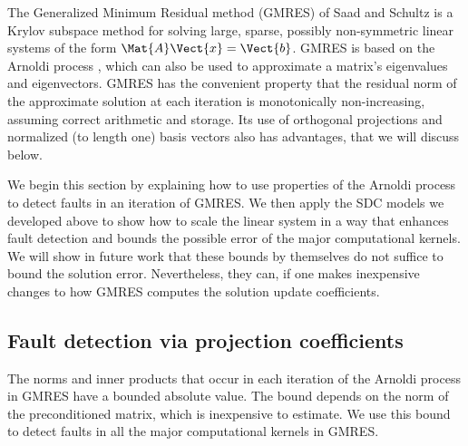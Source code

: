 The Generalized Minimum Residual method (GMRES) of Saad and Schultz
\cite{jje:saad1986gmres} is a Krylov subspace method for solving
large, sparse, possibly non-symmetric linear systems of the form
$\Mat{A}\Vect{x}=\Vect{b}$.
GMRES is based on the Arnoldi process \cite{mfh:arnoldi1951principle}, which
can also be used to approximate a matrix's eigenvalues and
eigenvectors.  GMRES has the convenient property that the residual
norm of the approximate solution at each iteration is monotonically
non-increasing, assuming correct arithmetic and storage.  Its use of
orthogonal projections and normalized (to length one) basis vectors
also has advantages, that we will discuss below.

We begin this section by explaining how to use properties of the
Arnoldi process to detect faults in an iteration of GMRES.  We then
apply the SDC models we developed above to show how to scale the
linear system in a way that enhances fault detection and bounds the
possible error of the major computational kernels.  We will show in
future work that these bounds by themselves do not suffice to bound
the solution error.  Nevertheless, they can, if one makes inexpensive
changes to how GMRES computes the solution update coefficients.

\subsection{Fault detection via projection coefficients}
\label{jje:sec:gmres:hessenberg}


The norms and inner products that occur in each iteration of the
Arnoldi process in GMRES have a bounded absolute value.  
The bound depends on the norm of the preconditioned matrix, which is
inexpensive to estimate.  We use this bound to detect faults in all the major
computational kernels in GMRES.



